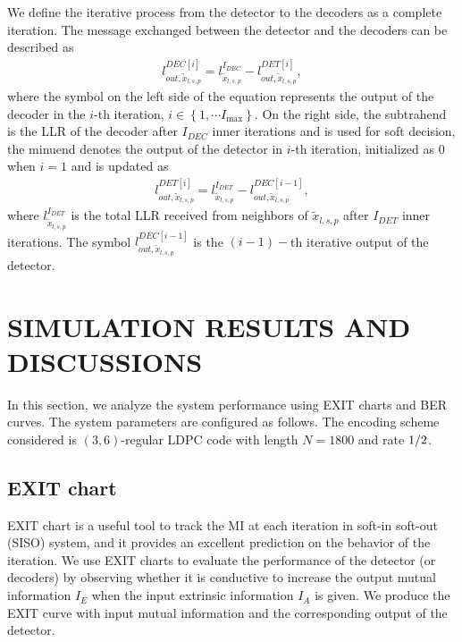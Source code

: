 \documentclass[conference]{IEEEtran}
\begin{document}
We define the iterative process from the detector to the decoders as a complete iteration. The message exchanged between the detector and the decoders can be described as
\begin{equation}
\begin{aligned}
l_{out,{{\tilde {x}}_{l,s,p}}}^{DEC[i]} = l_{{{\tilde {x}}_{l,s,p}}}^{{I_{DEC}}} - l_{out,{{\tilde {x}}_{l,s,p}}}^{DET[i]}\label{17},
\end{aligned}
\end{equation}
where the symbol on the left side of the equation represents the output of the decoder in the $i$-th iteration, $i \in \left\{ {1, \cdots {I_{\max }}} \right\}$. On the right side, the subtrahend is the LLR of the decoder after ${{I_{DEC}}}$ inner iterations and is used for soft decision, the minuend denotes the output of the detector in $i$-th iteration, initialized as $0$ when $i=1$ and is updated as
\begin{equation}
\begin{aligned}
l_{out,{{\tilde {x}}_{l,s,p}}}^{DET[i]} = l_{{{\tilde {x}}_{l,s,p}}}^{{I_{DET}}} - l_{out,{{\tilde {x}}_{l,s,p}}}^{DEC[i - 1]}\label{18},
\end{aligned}
\end{equation}
where $l_{{{\tilde {x}}_{l,s,p}}}^{{I_{DET}}}$ is the total LLR received from neighbors of ${{{\tilde {x}}_{l,s,p}}}$ after ${{I_{DET}}}$ inner iterations. The symbol $l_{out,{{\tilde {x}}_{l,s,p}}}^{DEC[i - 1]}$ is the $(i - 1)-$th iterative output of the detector.

\section{SIMULATION RESULTS AND DISCUSSIONS}
In this section, we analyze the system performance using EXIT charts and BER curves. The system parameters are configured as follows. The encoding scheme considered is $(3,6)$-regular LDPC code with length $N=1800$ and rate ${1 \mathord{\left/
 {\vphantom {1 2}} \right.
 \kern-\nulldelimiterspace} 2}$.
\subsection{EXIT chart}
EXIT chart is a useful tool to track the MI at each iteration in soft-in soft-out (SISO) system, and it provides an excellent prediction on the behavior of the iteration. We use EXIT charts to evaluate the performance of the detector (or decoders) by observing whether it is conductive to increase the output mutual information ${I_E}$ when the input extrinsic information ${I_A}$ is given. We produce the EXIT curve with input mutual information and the corresponding output of the detector.
\end{document}
